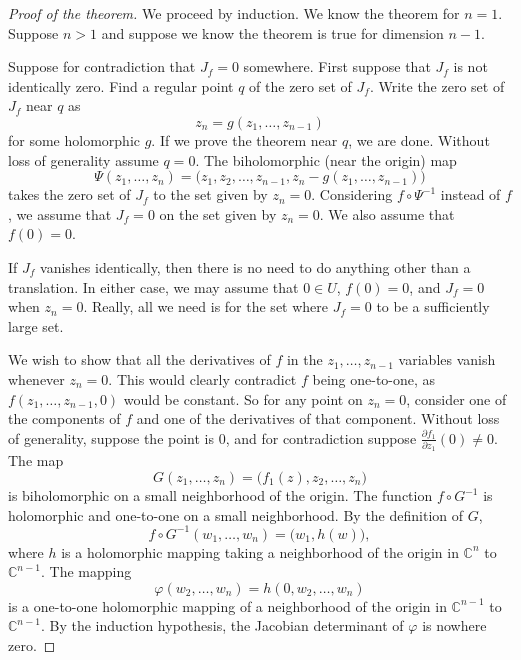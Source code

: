 \documentclass[12pt,openany]{book}
\newcommand{\C}{{\mathbb{C}}}
\theoremstyle{plain}
\theoremstyle{remark}
\theoremstyle{definition}
\theoremstyle{exercise}
\theoremstyle{example}
\begin{document}
\begin{proof}[Proof of the theorem]
We proceed by induction.  We know the theorem for $n=1$.
Suppose $n > 1$ and suppose we know the theorem is true for dimension $n-1$.

Suppose for contradiction that $J_f = 0$ somewhere.
First suppose that $J_f$ is not identically zero.
Find a regular point $q$ of the zero set of $J_f$.
Write the zero set of $J_f$ near $q$ as
\begin{equation*}
z_n = g(z_1,\ldots,z_{n-1})
\end{equation*}
for some holomorphic $g$.
If we prove the theorem near $q$, we are done.  Without loss of generality
assume $q=0$.  The biholomorphic (near the origin) map
\begin{equation*}
\Psi(z_1,\ldots,z_n) = \bigl(z_1,z_2,\ldots,z_{n-1},z_n-g(z_1,\ldots,z_{n-1}) \bigr)
\end{equation*}
takes the zero set of $J_f$ to the set given by $z_n=0$.  Considering
$f \circ \Psi^{-1}$ instead of $f$, we assume
that $J_f = 0$ on the set given by $z_n=0$.  We also
assume that $f(0) = 0$.

If $J_f$ vanishes identically, then there is no need to do anything other
than a translation.  In either case,
we may assume that $0 \in U$, $f(0)=0$, and
$J_f = 0$ when $z_n=0$.
Really, all we need is for the set where $J_f=0$ to be a sufficiently
large set.

We wish to show that all the derivatives of $f$ in the $z_1,\ldots,z_{n-1}$
variables vanish whenever $z_n = 0$.  This
would clearly contradict $f$ being one-to-one,
as $f(z_1,\ldots,z_{n-1},0)$ would be constant.
So for any point on $z_n=0$,
consider one of the components
of $f$ and one of the derivatives of that component.
Without loss of generality, suppose the point is $0$, and
for contradiction suppose
$\frac{\partial f_1}{\partial z_1}(0) \neq 0$.
The map
\begin{equation*}
G(z_1,\ldots,z_n) = \bigl(f_1(z),z_2,\ldots,z_n\bigr)
\end{equation*}
is biholomorphic on a small neighborhood of the origin.
The function $f \circ G^{-1}$ is holomorphic and one-to-one on a small
neighborhood.  By the definition of $G$,
\begin{equation*}
f \circ G^{-1} (w_1,\ldots,w_n) = \bigl(w_1,h(w)\bigr) ,
\end{equation*}
where $h$ is a holomorphic mapping taking a neighborhood of the
origin in $\C^n$ to $\C^{n-1}$.
The mapping
\begin{equation*}
\varphi(w_2,\ldots,w_n) = h(0,w_2,\ldots,w_n)
\end{equation*}
is a one-to-one holomorphic mapping of a neighborhood of the origin in
$\C^{n-1}$ to $\C^{n-1}$.  By the induction hypothesis, the Jacobian determinant of
$\varphi$ is nowhere zero.


\end{proof}
\end{document}
